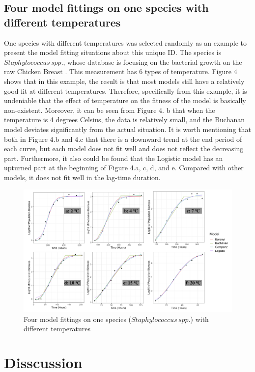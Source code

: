 \documentclass[11pt]{article}
\begin{document}
\subsection{Four model fittings on one species with different temperatures}
One species with different temperatures was selected randomly as an example to present the model fitting situations about this unique ID. The species is $Staphylococcus\,spp.$, whose database is focusing on the bacterial growth on the raw Chicken Breast \citep{R19}. This measurement has 6 types of temperature. Figure 4 shows that in this example, the result is that most models still have a relatively good fit at different temperatures. Therefore, specifically from this example, it is undeniable that the effect of temperature on the fitness of the model is basically non-existent. Moreover, it can be seen from Figure 4. b that when the temperature is 4 degrees Celsius, the data is relatively small, and the Buchanan model deviates significantly from the actual situation. It is worth mentioning that both in Figure 4.b and 4.c that there is a downward trend at the end period of each curve, but each model does not fit well and does not reflect the decreasing part. Furthermore, it also could be found that the Logistic model has an upturned part at the beginning of Figure 4.a, c, d, and e. Compared with other models, it does not fit well in the lag-time duration.
\begin{figure}[htpb]
\centering
\includegraphics[width = \textwidth]{../Code/Materials/figure4.jpg}
       \caption{Four model fittings on one species ($Staphylococcus\,spp.$) with different temperatures }
	    \end{figure}


\section{Disscussion}
\end{document}
